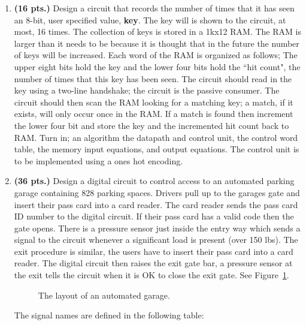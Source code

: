 \begin{enumerate}
\item \textbf{ (16 pts.)} Design a circuit that records the number of times that it
has seen an 8-bit, user specified value, \textbf{ key}.  The key will
is shown to the circuit, at most, 16 times.  The collection of 
keys is stored in a 1kx12 RAM.  The RAM is larger
than it needs to be because it is thought that in the future
the number of keys will be increased.  Each word of the RAM is 
organized as follows; The upper eight bits hold the key and the lower
four bits hold the ``hit count", the number of times that this key has
been seen.  The circuit should read in the key using a two-line
handshake; the circuit is the passive consumer.  The circuit
should then scan the RAM looking for a matching key; a match, if
it exists, will only occur once in the RAM.  If a match is 
found then increment the lower four bit and store the key and the
incremented hit count back to RAM.  
Turn in; an algorithm the datapath and control unit, the control word 
table, the memory input equations, and output equations.  
The control unit is to be implemented using a ones hot encoding.


\item \textbf{ (36 pts.)}
Design a digital circuit to control access to an
automated parking garage containing 828 parking spaces.  
Drivers pull up to the garages gate and insert 
their pass card into a card reader.  The card reader sends the pass card
ID number to the digital circuit.  If their pass card has a valid
code then the gate opens.  There is a pressure sensor just inside the
entry way which sends a signal to the circuit whenever a significant
load is present (over 150 lbs).
The exit procedure is similar, the users have to insert their pass card
into a card reader.  The digital circuit then raises the exit gate bar,
a pressure sensor at the exit tells the circuit when it is OK to close
the exit gate.  See Figure~\ref{fig:Garage}.
\begin{figure}[ht]
\caption{The layout of an automated garage.}
\label{fig:Garage}
\end{figure}

The signal names are defined in the following table:


\end{enumerate}
